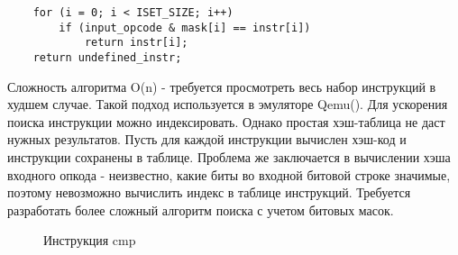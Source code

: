 \begin{verbatim}
    for (i = 0; i < ISET_SIZE; i++)
        if (input_opcode & mask[i] == instr[i])
            return instr[i];
    return undefined_instr;
\end{verbatim}

Сложность алгоритма O(n) - требуется просмотреть весь набор инструкций в худшем случае. Такой подход используется в эмуляторе Qemu(\cite{bib:qemu}). Для ускорения поиска инструкции можно индексировать. Однако простая хэш-таблица не даст нужных результатов. Пусть для каждой инструкции вычислен хэш-код и инструкции сохранены в таблице. Проблема же заключается в вычислении хэша входного опкода - неизвестно, какие биты во входной битовой строке значимые, поэтому невозможно вычислить индекс в таблице инструкций. Требуется разработать более сложный алгоритм поиска с учетом битовых масок.


\begin{figure}[h!] \label{img:cmp_instr}
    \caption{Инструкция cmp }
    \label{img:fmt_cmp}
\end{figure}
